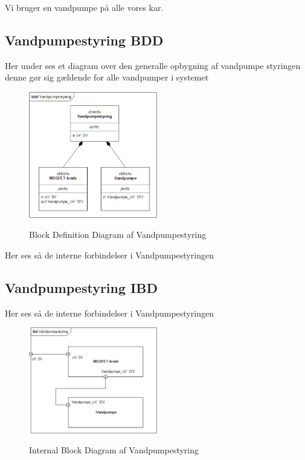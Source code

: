 
Vi bruger en vandpumpe på alle vores kar.

\subsection{Vandpumpestyring BDD}

Her under ses et diagram over den generalle opbygning af vandpumpe styringen denne gør sig gældende for alle vandpumper i systemet

\begin{figure}[H]
	\centering
	\includegraphics[width=0.5\textwidth]{Systemarkitektur/Vandpumpe/Vandpumpe_BDD.png}
	\label{fig:Ventilstyring BDD}
	\caption{Block Definition Diagram af Vandpumpestyring}
\end{figure}

Her ses så de interne forbindelser i Vandpumpestyringen 

\subsection{Vandpumpestyring IBD}

Her ses så de interne forbindelser i Vandpumpestyringen 

\begin{figure}[H]
	\centering
	\includegraphics[width=0.5\textwidth]{Systemarkitektur/Vandpumpe/Vandpumpe_IBD.png}
	\label{fig:Vandpumpestyring IBD}
	\caption{Internal Block Diagram af Vandpumpestyring}
\end{figure}


